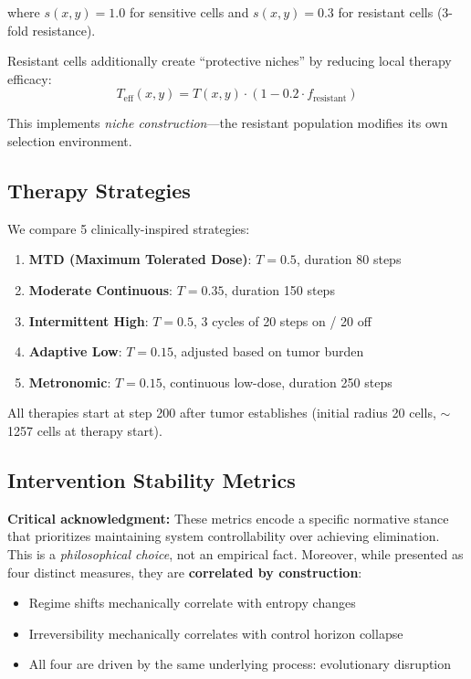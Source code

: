 \documentclass[11pt,a4paper]{article}
\begin{document}
where $s(x,y) = 1.0$ for sensitive cells and $s(x,y) = 0.3$ for resistant cells (3-fold resistance).

Resistant cells additionally create ``protective niches'' by reducing local therapy efficacy:
\[
T_{\text{eff}}(x,y) = T(x,y) \cdot (1 - 0.2 \cdot f_{\text{resistant}})
\]

This implements \textit{niche construction}---the resistant population modifies its own selection environment.

\subsection{Therapy Strategies}

We compare 5 clinically-inspired strategies:

\begin{enumerate}
    \item \textbf{MTD (Maximum Tolerated Dose)}: $T = 0.5$, duration 80 steps
    \item \textbf{Moderate Continuous}: $T = 0.35$, duration 150 steps
    \item \textbf{Intermittent High}: $T = 0.5$, 3 cycles of 20 steps on / 20 off
    \item \textbf{Adaptive Low}: $T = 0.15$, adjusted based on tumor burden
    \item \textbf{Metronomic}: $T = 0.15$, continuous low-dose, duration 250 steps
\end{enumerate}

All therapies start at step 200 after tumor establishes (initial radius 20 cells, $\sim$1257 cells at therapy start).

\subsection{Intervention Stability Metrics}

\textbf{Critical acknowledgment:} These metrics encode a specific normative stance that prioritizes maintaining system controllability over achieving elimination. This is a \textit{philosophical choice}, not an empirical fact. Moreover, while presented as four distinct measures, they are \textbf{correlated by construction}:
\begin{itemize}
    \item Regime shifts mechanically correlate with entropy changes
    \item Irreversibility mechanically correlates with control horizon collapse
    \item All four are driven by the same underlying process: evolutionary disruption
\end{itemize}
\end{document}
